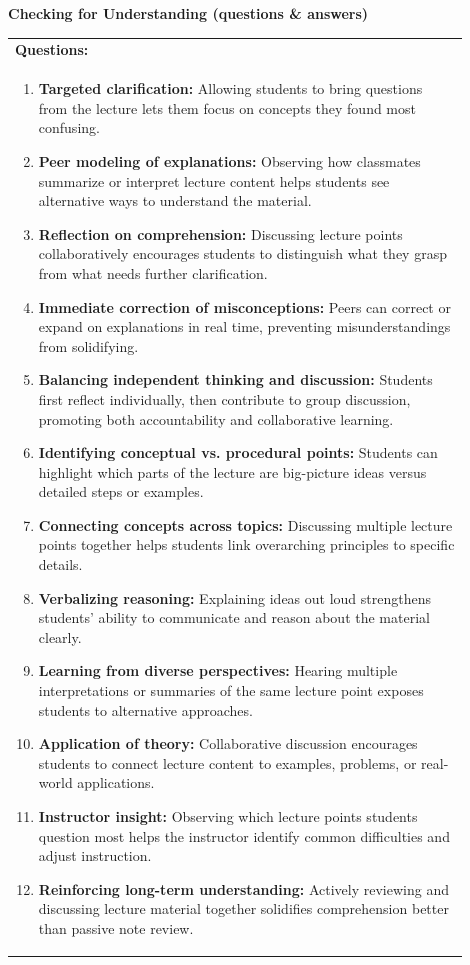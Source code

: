 \documentclass{article}
\begin{document}
{\newpage
\noindent
{\large\textbf{Checking for Understanding (questions \& answers)}}\\[0.2em]
\noindent
\begin{tabular}{|p{0.9\linewidth}|}
\hline
\textbf{Questions:} \\
\begin{enumerate}
    \item \textbf{Targeted clarification:} Allowing students to bring questions from the lecture lets them focus on concepts they found most confusing.
    \item \textbf{Peer modeling of explanations:} Observing how classmates summarize or interpret lecture content helps students see alternative ways to understand the material.
    \item \textbf{Reflection on comprehension:} Discussing lecture points collaboratively encourages students to distinguish what they grasp from what needs further clarification.
    \item \textbf{Immediate correction of misconceptions:} Peers can correct or expand on explanations in real time, preventing misunderstandings from solidifying.
    \item \textbf{Balancing independent thinking and discussion:} Students first reflect individually, then contribute to group discussion, promoting both accountability and collaborative learning.
    \item \textbf{Identifying conceptual vs. procedural points:} Students can highlight which parts of the lecture are big-picture ideas versus detailed steps or examples.
    \item \textbf{Connecting concepts across topics:} Discussing multiple lecture points together helps students link overarching principles to specific details.
    \item \textbf{Verbalizing reasoning:} Explaining ideas out loud strengthens students’ ability to communicate and reason about the material clearly.
    \item \textbf{Learning from diverse perspectives:} Hearing multiple interpretations or summaries of the same lecture point exposes students to alternative approaches.
    \item \textbf{Application of theory:} Collaborative discussion encourages students to connect lecture content to examples, problems, or real-world applications.
    \item \textbf{Instructor insight:} Observing which lecture points students question most helps the instructor identify common difficulties and adjust instruction.
    \item \textbf{Reinforcing long-term understanding:} Actively reviewing and discussing lecture material together solidifies comprehension better than passive note review.
\end{enumerate} \\
\hline  
\end{tabular}

}
\end{document}
